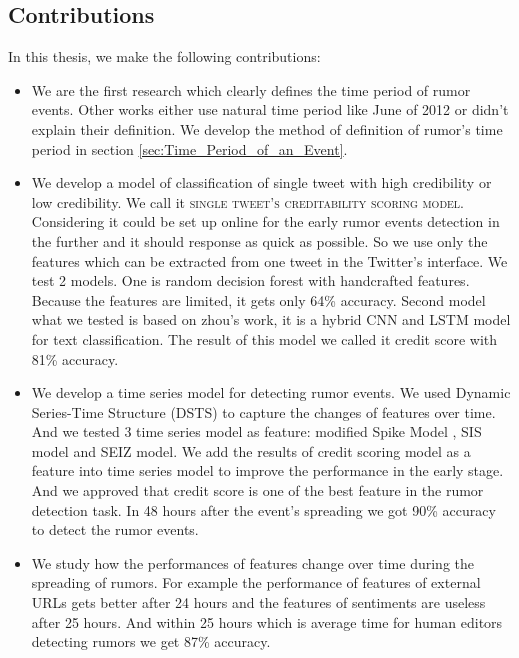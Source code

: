  \newpage
 \subsection{Contributions}
In this thesis, we make the following contributions:

\begin{itemize}
	\item We are the first research which clearly defines the time period of rumor events. Other works either use natural time period like June of 2012 or didn't explain their definition. We develop the method of definition of rumor's time period in section \ref{sec:Time_Period_of_an_Event}. 
	\item We develop a model of classification of single tweet with high credibility or low credibility. We call it \textsc{single tweet's creditability scoring model}. Considering it could be set up online for the early rumor events detection in the further and it should response as quick as possible. So we use only the features which can be extracted from one tweet in the Twitter's interface. We test 2 models. One is random decision forest with handcrafted features. Because the features are limited, it gets only 64\% accuracy. Second model what we tested is based on zhou's\cite{zhou2015c} work, it is a hybrid CNN and LSTM model for text classification. The result of this model we called it credit score with 81\% accuracy.

 	\item We develop a time series model for detecting rumor events. We used Dynamic Series-Time Structure (DSTS)\cite{liu2015real} to capture the changes of features over time. And we tested 3 time series model as feature: modified Spike Model \cite{kwon2013prominent}, SIS model and SEIZ model\cite{jin2013epidemiological}. We add the results of credit scoring model as a feature into time series model to improve the performance in the early stage. And we approved that credit score is one of the best feature in the rumor detection task. In 48 hours after the event's spreading we got 90\% accuracy to detect the rumor events. 

 	\item We study how the performances of features change over time during the spreading of rumors. For example the performance of features of external URLs gets better after 24 hours and the features of sentiments are useless after 25 hours.  And within 25 hours which is average time for human editors detecting rumors we get 87\% accuracy.

 \end{itemize}
 

